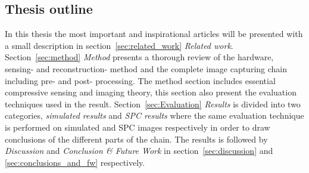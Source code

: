 \subsection{Thesis outline}
In this thesis the most important and inspirational articles will be presented with a small description in section~\ref{sec:related_work} \textit{Related work}. Section~\ref{sec:method} \textit{Method} presents a thorough review of the hardware, sensing- and reconstruction- method and the complete image capturing chain including pre- and post- processing. The method section includes essential compressive sensing and imaging theory, this section also present the evaluation techniques used in the result. Section~\ref{sec:Evaluation} \textit{Results} is divided into two categories, \textit{simulated results} and \textit{SPC results} where the same evaluation technique is performed on simulated and SPC images respectively in order to draw conclusions of the different parts of the chain. The results is followed by \textit{Discussion} and \textit{Conclusion \& Future Work} in section~\ref{sec:discussion} and \ref{sec:conclusions_and_fw} respectively. 
